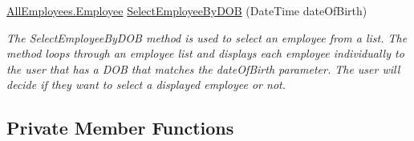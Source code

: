 \begin{DoxyCompactItemize}
\hyperlink{class_all_employees_1_1_employee}{All\+Employees.\+Employee} \hyperlink{class_the_company_1_1_container_a6941dad941fbf4b61ff2c26c083066e3}{Select\+Employee\+By\+D\+O\+B} (Date\+Time date\+Of\+Birth)
\begin{DoxyCompactList}\small\item\em The Select\+Employee\+By\+D\+O\+B method is used to select an employee from a list. The method loops through an employee list and displays each employee individually to the user that has a D\+O\+B that matches the date\+Of\+Birth parameter. The user will decide if they want to select a displayed employee or not. \end{DoxyCompactList}\end{DoxyCompactItemize}
\subsection*{Private Member Functions}
